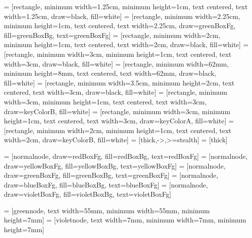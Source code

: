 

 = [rectangle, minimum width=1.25cm, minimum height=1cm, text centered, text width=1.25cm, draw=black, fill=white]
 = [rectangle, minimum width=2.25cm, minimum height=1cm, text centered, text width=2.25cm, draw=greenBoxFg, fill=greenBoxBg, text=greenBoxFg]
 = [rectangle, minimum width=2cm, minimum height=1cm, text centered, text width=2cm, draw=black, fill=white]
 = [rectangle, minimum width=3cm, minimum height=1cm, text centered, text width=3cm, draw=black, fill=white]
 = [rectangle, minimum width=62mm, minimum height=8mm, text centered, text width=62mm, draw=black, fill=white]
 = [rectangle, minimum width=3.5cm, minimum height=2cm, text centered, text width=3cm, draw=black, fill=white]
 = [rectangle, minimum width=3cm, minimum height=1cm, text centered, text width=3cm, draw=keyColorB, fill=white]
 = [rectangle, minimum width=3cm, minimum height=1cm, text centered, text width=3cm, draw=keyColorA, fill=white]
 = [rectangle, minimum width=2cm, minimum height=1cm, text centered, text width=2cm, draw=keyColorB, fill=white]
 = [thick,->,>=stealth]
 = [thick]

 = [normalnode, draw=redBoxFg, fill=redBoxBg, text=redBoxFg]
 = [normalnode, draw=yellowBoxFg, fill=yellowBoxBg, text=yellowBoxFg]
 = [normalnode, draw=greenBoxFg, fill=greenBoxBg, text=greenBoxFg]
 = [normalnode, draw=blueBoxFg, fill=blueBoxBg, text=blueBoxFg]
 = [normalnode, draw=violetBoxFg, fill=violetBoxBg, text=violetBoxFg]

 = [greennode, text width=55mm, minimum width=55mm, minimum height=7mm]
 = [violetnode, text width=7mm, minimum width=7mm, minimum height=7mm]



